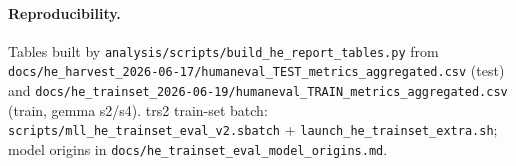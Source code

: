 \documentclass[11pt,a4paper]{article}
\begin{document}
\paragraph{Reproducibility.} Tables built by
\texttt{analysis/scripts/build\_he\_report\_tables.py} from
\texttt{docs/he\_harvest\_2026-06-17/humaneval\_TEST\_metrics\_aggregated.csv} (test) and
\texttt{docs/he\_trainset\_2026-06-19/humaneval\_TRAIN\_metrics\_aggregated.csv} (train,
gemma s2/s4). trs2 train-set batch: \texttt{scripts/mll\_he\_trainset\_eval\_v2.sbatch} +
\texttt{launch\_he\_trainset\_extra.sh}; model origins in
\texttt{docs/he\_trainset\_eval\_model\_origins.md}.
\end{document}
